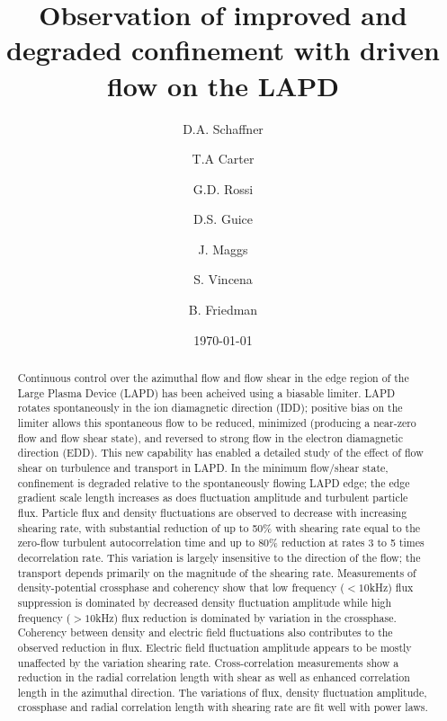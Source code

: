 \documentclass[%
 aps,
 prl,
 amsmath,amssymb,
 reprint,%
]{revtex4-1}
\begin{document}
\title{Observation of improved and degraded confinement with driven flow on the LAPD}
\author{D.A. Schaffner}
\author{T.A Carter}
\author{G.D. Rossi}
\author{D.S. Guice}
\author{J. Maggs}
\author{S. Vincena}
\author{B. Friedman}

\date{\today}%

\begin{abstract}
Continuous control over the azimuthal flow and flow shear in the edge region of the Large Plasma Device (LAPD) has been acheived using a biasable limiter.  LAPD rotates spontaneously in the ion diamagnetic direction (IDD); positive bias on the limiter allows this spontaneous
flow to be reduced, minimized (producing a near-zero flow and flow shear state), and reversed to strong flow in the electron diamagnetic direction (EDD).  This new capability has enabled a detailed study of the effect of flow shear on turbulence and transport in LAPD.  In the minimum flow/shear state, confinement is degraded relative to the spontaneously flowing LAPD edge;  the edge gradient scale
length increases as does fluctuation amplitude and turbulent particle flux.  Particle flux and density fluctuations are observed to decrease with increasing shearing rate, with substantial reduction of up to 50\% with shearing rate equal to the zero-flow turbulent autocorrelation time and up to 80\% reduction at rates 3 to 5 times decorrelation rate.  This variation is largely insensitive to the direction of the flow; the transport depends primarily on the magnitude of the shearing rate. Measurements of density-potential crossphase and coherency show that low frequency ($<10$kHz) flux suppression is dominated by decreased density fluctuation amplitude while high frequency ($>10$kHz) flux reduction is dominated by variation in the crossphase. Coherency between density and electric field fluctuations also contributes to the observed reduction in flux.  Electric field fluctuation amplitude appears to be mostly unaffected by the variation shearing rate. Cross-correlation measurements show a reduction in the radial correlation length with shear as well as enhanced correlation length in the azimuthal direction.   The variations of flux, density fluctuation amplitude, crossphase and radial correlation length with shearing rate are fit well with power laws.


\end{abstract}
\end{document}
